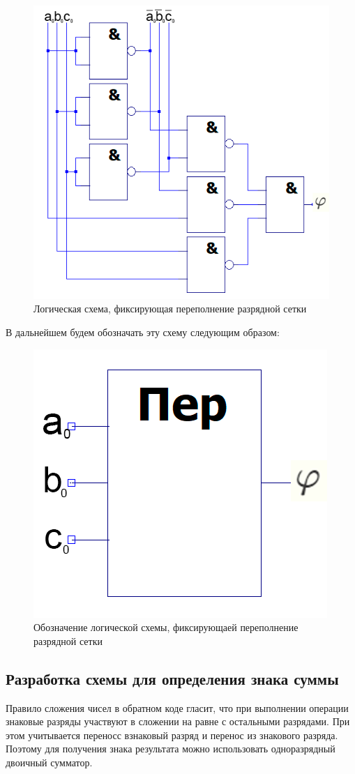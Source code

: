 \documentclass[a4paper,14pt]{article}
\begin{document}
\begin{figure}[H]
	\centering
	\includegraphics[width=0.6\linewidth]{images/perep_sh}
	\caption{Логическая схема, фиксирующая переполнение разрядной сетки}
	\label{fig:perep_sh}
\end{figure}

В дальнейшем будем обозначать эту схему следующим образом:

\begin{figure}[H]
	\centering
	\includegraphics[width=0.4\linewidth]{images/perep_el}
	\caption{Обозначение логической схемы, фиксирующаей переполнение разрядной сетки}
	\label{fig:perep_el}
\end{figure}

\subsection{Разработка схемы для определения знака суммы}

Правило сложения чисел в обратном коде гласит, что при выполнении операции знаковые разряды участвуют в сложении на равне с остальными разрядами. При этом учитывается  переносс взнаковый разряд и перенос из знакового разряда. Поэтому для получения знака результата можно использовать  одноразрядный двоичный сумматор.
\end{document}
